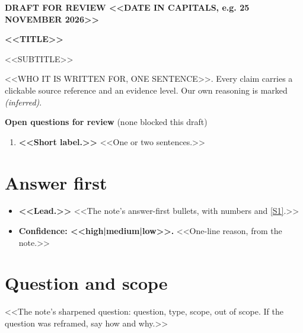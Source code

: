 \documentclass[11pt,a4paper]{article}
\newcommand{\src}[1]{\hyperlink{src:#1}{[#1]}}
\newcommand{\reportlogo}{}
\begin{document}
{\color{accent}\bfseries\small DRAFT FOR REVIEW \quad\textbar\quad <<DATE IN CAPITALS, e.g. 25 NOVEMBER 2026>>\hfill\normalcolor\reportlogo\par}
\vspace{0.4em}
{\fontsize{26}{30}\selectfont\bfseries <<TITLE>>\par}
{\fontsize{15}{19}\selectfont\color{muted} <<SUBTITLE>>\par}
\vspace{0.6em}
{\small\color{muted} <<WHO IT IS WRITTEN FOR, ONE SENTENCE>>. Every claim carries a clickable source reference and an
evidence level. Our own reasoning is marked \emph{(inferred)}.\par}

\begin{callout}
\textbf{Open questions for review} (none blocked this draft)
\begin{enumerate}[leftmargin=1.6em, itemsep=0.15em]
  \item \textbf{<<Short label.>>} <<One or two sentences.>>
\end{enumerate}
\end{callout}

\section{Answer first}
\begin{itemize}
  \item \textbf{<<Lead.>>} <<The note's answer-first bullets, with numbers and \src{S1}.>>
  \item \textbf{Confidence: <<high|medium|low>>.} <<One-line reason, from the note.>>
\end{itemize}

\section{Question and scope}
<<The note's sharpened question: question, type, scope, out of scope. If the question was reframed, say how and why.>>
\end{document}
